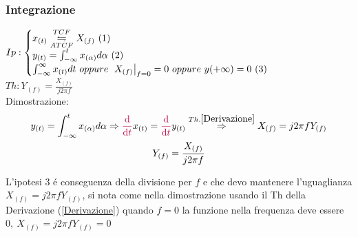         \subsubsection{Integrazione}\label{Integrazione}
            $Ip:\begin{cases}
                x_{(t)} \overunderset{TCF}{ATCF}{\leftrightharpoons} X_{(f)}\ (1)\\
                y_{(t)} = \int_{-\infty}^{t} x_{(\alpha)} d\alpha\ (2) \\
                \int_{-\infty}^{\infty} x_{(t)} dt\ oppure\ \eval*{X_{(f)}}_{f=0} = 0 \ oppure\ y{(+\infty)} = 0\ (3) \\
            \end{cases}$\\
            $Th: Y_{(f)} =\frac{X_{(f)}}{j2\pi f}$ \\
            Dimostrazione:\\
            \begin{gather}
                y_{(t)} = \int_{-\infty}^{t} x_{(\alpha)} d\alpha \Rightarrow {\color{purple}\derivative{}{t}} x_{(t)} = {\color{purple}\derivative{}{t}} y_{(t)} \overset{Th. \ref{Derivazione}}{\Rightarrow}  X_{(f)} = j2\pi f Y_{(f)} \nonumber\\
                         Y_{(f)} =\frac{X_{(f)}}{j2\pi f}\nonumber
            \end{gather}

            L'ipotesi 3 é conseguenza della divisione per $f$ e che devo mantenere l'uguaglianza $X_{(f)} = j2\pi f Y_{(f)}$, si nota come nella dimostrazione usando il Th della Derivazione (\ref{Derivazione})
            quando $f=0$ la funzione nella frequenza deve essere $0,\ X_{(f)} = j2\pi f Y_{(f)} = 0$ 
        
